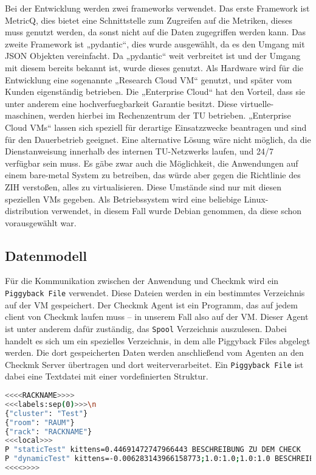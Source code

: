 \noindent
Bei der Entwicklung werden zwei \Gls{framework}s verwendet.
Das erste Framework ist \Gls{MetricQ}, dies bietet eine Schnittstelle zum Zugreifen auf die Metriken, dieses muss genutzt werden, da sonst nicht auf die Daten zugegriffen werden kann.
Das zweite Framework ist „pydantic“, dies wurde ausgewählt, da es den Umgang mit \acrshort{JSON} Objekten vereinfacht.
Da „pydantic“ weit verbreitet ist und der Umgang mit diesem bereits bekannt ist, wurde dieses genutzt.
Als Hardware wird für die Entwicklung eine sogenannte „Research Cloud VM“ genutzt, und später vom Kunden eigenständig betrieben.
Die „Enterprise Cloud“ hat den Vorteil, dass sie unter anderem eine \Gls{hochverfuegbarkeit} Garantie besitzt.
Diese \Gls{virtuelle-maschine}n, werden hierbei im Rechenzentrum der \acrshort{TU} betrieben.
„Enterprise Cloud VMs“ lassen sich speziell für derartige Einsatzzwecke beantragen und sind für den Dauerbetrieb geeignet.
Eine alternative Lösung wäre nicht möglich, da die Dienstanweisung innerhalb des internen \acrshort{TU}-Netzwerks laufen, und 24/7 verfügbar sein muss.
Es gäbe zwar auch die Möglichkeit, die Anwendungen auf einem \Gls{bare-metal} System zu betreiben, das würde aber gegen die Richtlinie des \acrshort{ZIH} verstoßen, alles zu virtualisieren.
Diese Umstände sind nur mit diesen speziellen \acrshort{VM}s gegeben.
Als Betriebssystem wird eine beliebige Linux-\Gls{distribution} verwendet, in diesem Fall wurde Debian genommen, da diese schon vorausgewählt war.

\subsection{Datenmodell}
Für die Kommunikation zwischen der Anwendung und \Gls{Checkmk} wird ein \texttt{Piggyback File} verwendet.
Diese Dateien werden in ein bestimmtes Verzeichnis auf der \acrshort{VM} gespeichert.
Der \Gls{Checkmk} Agent ist ein Programm, das auf jedem \Gls{client} von \Gls{Checkmk} laufen muss – in unserem Fall also auf der \acrshort{VM}.
Dieser Agent ist unter anderem dafür zuständig, das \texttt{Spool} Verzeichnis auszulesen.
Dabei handelt es sich um ein spezielles Verzeichnis, in dem alle Piggyback Files abgelegt werden.
Die dort gespeicherten Daten werden anschließend vom Agenten an den \Gls{Checkmk} Server übertragen und dort weiterverarbeitet.
Ein \texttt{Piggyback File} ist dabei eine Textdatei mit einer vordefinierten Struktur.

\begin{lstlisting}[language=bash, caption=Beispiel Piggyback File, label=lst:piggyback-file]
<<<<RACKNAME>>>>
<<<labels:sep(0)>>>\n
{"cluster": "Test"}
{"room": "RAUM"}
{"rack": "RACKNAME"}
<<<local>>>
P "staticTest" kittens=0.44691472747966443 BESCHREIBUNG ZU DEM CHECK
P "dynamicTest" kittens=-0.006283143966158773;1.0:1.0;1.0:1.0 BESCHREIBUNG ZU DEM CHECK
<<<<>>>>

\end{lstlisting}

